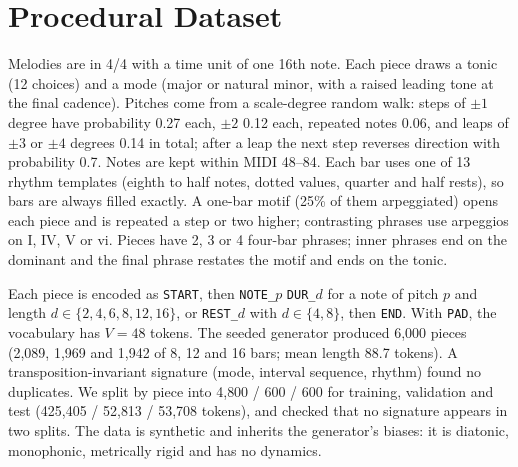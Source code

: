 \documentclass[conference]{IEEEtran}
\begin{document}
\section{Procedural Dataset}
Melodies are in 4/4 with a time unit of one 16th note. Each piece draws a tonic (12 choices)
and a mode (major or natural minor, with a raised leading tone at the final cadence). Pitches
come from a scale-degree random walk: steps of $\pm1$ degree have probability 0.27 each,
$\pm2$ 0.12 each, repeated notes 0.06, and leaps of $\pm3$ or $\pm4$ degrees 0.14 in total;
after a leap the next step reverses direction with probability 0.7. Notes are kept within
MIDI 48--84. Each bar uses one of 13 rhythm templates (eighth to half notes, dotted values,
quarter and half rests), so bars are always filled exactly. A one-bar motif (25\% of them
arpeggiated) opens each piece and is repeated a step or two higher; contrasting phrases use
arpeggios on I, IV, V or vi. Pieces have 2, 3 or 4 four-bar phrases; inner phrases end on the
dominant and the final phrase restates the motif and ends on the tonic.

Each piece is encoded as \texttt{START}, then \texttt{NOTE\_$p$} \texttt{DUR\_$d$} for a note
of pitch $p$ and length $d\in\{2,4,6,8,12,16\}$, or \texttt{REST\_$d$} with
$d\in\{4,8\}$, then \texttt{END}. With \texttt{PAD}, the vocabulary has $V{=}48$ tokens.
The seeded generator produced 6{,}000 pieces (2{,}089, 1{,}969 and 1{,}942 of 8, 12 and 16
bars; mean length 88.7 tokens). A transposition-invariant signature (mode, interval sequence,
rhythm) found no duplicates. We split by piece into 4{,}800 / 600 / 600 for training,
validation and test (425{,}405 / 52{,}813 / 53{,}708 tokens), and checked that no signature
appears in two splits. The data is synthetic and inherits the generator's biases: it is
diatonic, monophonic, metrically rigid and has no dynamics.
\end{document}
